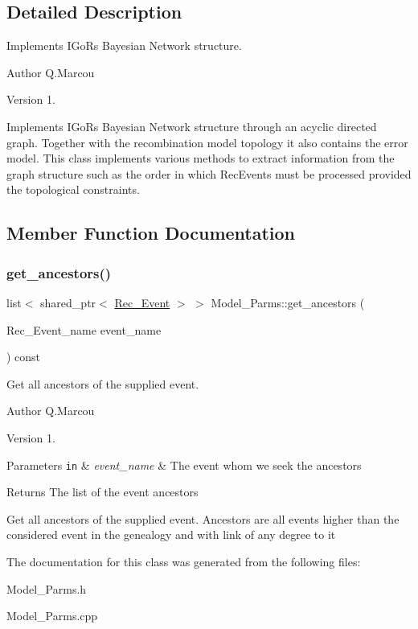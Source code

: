 \subsection{Detailed Description}
Implements I\+GoR\textquotesingle{}s Bayesian Network structure. 

\begin{DoxyAuthor}{Author}
Q.\+Marcou 
\end{DoxyAuthor}
\begin{DoxyVersion}{Version}
1.
\end{DoxyVersion}
Implements I\+GoR\textquotesingle{}s Bayesian Network structure through an acyclic directed graph. Together with the recombination model topology it also contains the error model. This class implements various methods to extract information from the graph structure such as the order in which Rec\+Events must be processed provided the topological constraints. 

\subsection{Member Function Documentation}
\mbox{\label{classModel__Parms_a01c910fc4e11151fbfba2a65a681e8f9}} 
\subsubsection{\texorpdfstring{get\+\_\+ancestors()}{get\_ancestors()}}
{\footnotesize\ttfamily list$<$ shared\+\_\+ptr$<$ \hyperlink{classRec__Event}{Rec\+\_\+\+Event} $>$ $>$ Model\+\_\+\+Parms\+::get\+\_\+ancestors (\begin{DoxyParamCaption}\item[{Rec\+\_\+\+Event\+\_\+name}]{event\+\_\+name }\end{DoxyParamCaption}) const}



Get all ancestors of the supplied event. 

\begin{DoxyAuthor}{Author}
Q.\+Marcou 
\end{DoxyAuthor}
\begin{DoxyVersion}{Version}
1. 
\end{DoxyVersion}

\begin{DoxyParams}[1]{Parameters}
\mbox{\tt in}  & {\em event\+\_\+name} & The event whom we seek the ancestors \\
\hline
\end{DoxyParams}
\begin{DoxyReturn}{Returns}
The list of the event ancestors
\end{DoxyReturn}
Get all ancestors of the supplied event. Ancestors are all events higher than the considered event in the genealogy and with link of any degree to it 

The documentation for this class was generated from the following files\+:\begin{DoxyCompactItemize}
\item 
Model\+\_\+\+Parms.\+h\item 
Model\+\_\+\+Parms.\+cpp\end{DoxyCompactItemize}

